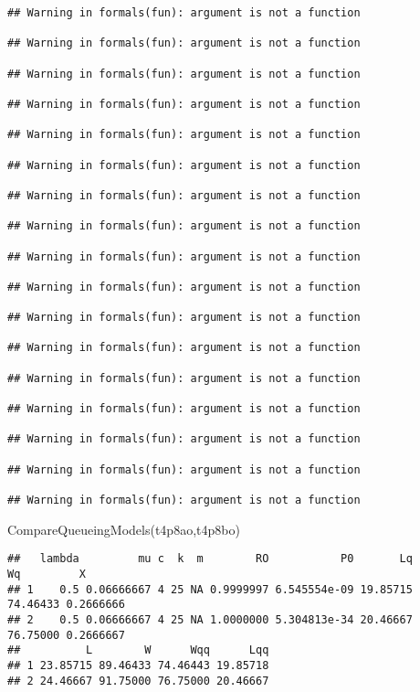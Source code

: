 \documentclass[
]{article}
\newenvironment{Shaded}{\begin{snugshade}}{\end{snugshade}}
\newcommand{\FunctionTok}[1]{\textcolor[rgb]{0.00,0.00,0.00}{#1}}
\newcommand{\NormalTok}[1]{#1}
\begin{document}
\begin{verbatim}
## Warning in formals(fun): argument is not a function

## Warning in formals(fun): argument is not a function

## Warning in formals(fun): argument is not a function

## Warning in formals(fun): argument is not a function

## Warning in formals(fun): argument is not a function

## Warning in formals(fun): argument is not a function

## Warning in formals(fun): argument is not a function

## Warning in formals(fun): argument is not a function

## Warning in formals(fun): argument is not a function

## Warning in formals(fun): argument is not a function

## Warning in formals(fun): argument is not a function

## Warning in formals(fun): argument is not a function

## Warning in formals(fun): argument is not a function

## Warning in formals(fun): argument is not a function

## Warning in formals(fun): argument is not a function

## Warning in formals(fun): argument is not a function

## Warning in formals(fun): argument is not a function
\end{verbatim}

\begin{Shaded}
\begin{Highlighting}[]
\FunctionTok{CompareQueueingModels}\NormalTok{(t4p8ao,t4p8bo)}
\end{Highlighting}
\end{Shaded}

\begin{verbatim}
##   lambda         mu c  k  m        RO           P0       Lq       Wq         X
## 1    0.5 0.06666667 4 25 NA 0.9999997 6.545554e-09 19.85715 74.46433 0.2666666
## 2    0.5 0.06666667 4 25 NA 1.0000000 5.304813e-34 20.46667 76.75000 0.2666667
##          L        W      Wqq      Lqq
## 1 23.85715 89.46433 74.46443 19.85718
## 2 24.46667 91.75000 76.75000 20.46667
\end{verbatim}
\end{document}
